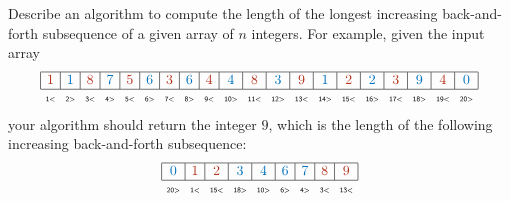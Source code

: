 \begin{enumerate}[label=\arabic*.,ref=\thechapter.\arabic*,leftmargin=*,align=left,widest*=99,itemsep=1.5ex plus 0.5ex]
Describe an algorithm to compute the length of the longest increasing back-and-forth subsequence of a given array of $n$ integers.
For example, given the input array
\[
\setlength{\arraycolsep}{3.7pt}
\begin{array}{|*{20}{c|}}
\hline
{\color{JEred}1} & {\color{JEcyan}1} & {\color{JEred}8} & {\color{JEcyan}7} & {\color{JEred}5} & {\color{JEcyan}6} & {\color{JEred}3} & {\color{JEcyan}6} & {\color{JEred}4} & {\color{JEcyan}4} & {\color{JEred}8} & {\color{JEcyan}3} & {\color{JEred}9} & {\color{JEcyan}1} & {\color{JEred}2} & {\color{JEcyan}2} & {\color{JEred}3} & {\color{JEcyan}9} & {\color{JEred}4} & {\color{JEcyan}0}\\
\hline
\multicolumn{1}{c}{\textsf{\tiny 1\textless}} & \multicolumn{1}{c}{\textsf{\tiny 2\textgreater}} & \multicolumn{1}{c}{\textsf{\tiny 3\textless}} & \multicolumn{1}{c}{\textsf{\tiny 4\textgreater}} & \multicolumn{1}{c}{\textsf{\tiny 5\textless}} & \multicolumn{1}{c}{\textsf{\tiny 6\textgreater}} & \multicolumn{1}{c}{\textsf{\tiny 7\textless}} & \multicolumn{1}{c}{\textsf{\tiny 8\textgreater}} & \multicolumn{1}{c}{\textsf{\tiny 9\textless}} & \multicolumn{1}{c}{\textsf{\tiny 10\textgreater}} & \multicolumn{1}{c}{\textsf{\tiny 11\textless}} & \multicolumn{1}{c}{\textsf{\tiny 12\textgreater}} & \multicolumn{1}{c}{\textsf{\tiny 13\textless}} & \multicolumn{1}{c}{\textsf{\tiny 14\textgreater}} & \multicolumn{1}{c}{\textsf{\tiny 15\textless}} & \multicolumn{1}{c}{\textsf{\tiny 16\textgreater}} & \multicolumn{1}{c}{\textsf{\tiny 17\textless}} & \multicolumn{1}{c}{\textsf{\tiny 18\textgreater}} & \multicolumn{1}{c}{\textsf{\tiny 19\textless}} & \multicolumn{1}{c}{\textsf{\tiny 20\textgreater}}
\end{array}
\]
your algorithm should return the integer $9$, which is the length of the following increasing back-and-forth subsequence:
\[
\setlength{\arraycolsep}{3.7pt}
\begin{array}{|*{9}{c|}}
\hline
{\color{JEcyan}0} & {\color{JEred}1} & {\color{JEred}2} & {\color{JEcyan}3} & {\color{JEcyan}4} & {\color{JEcyan}6} & {\color{JEcyan}7} & {\color{JEred}8} & {\color{JEred}9}\\
\hline
\multicolumn{1}{c}{\textsf{\tiny 20\textgreater}} & \multicolumn{1}{c}{\textsf{\tiny 1\textless}} & \multicolumn{1}{c}{\textsf{\tiny 15\textless}} & \multicolumn{1}{c}{\textsf{\tiny 18\textgreater}} & \multicolumn{1}{c}{\textsf{\tiny 10\textgreater}} & \multicolumn{1}{c}{\textsf{\tiny 6\textgreater}} & \multicolumn{1}{c}{\textsf{\tiny 4\textgreater}} & \multicolumn{1}{c}{\textsf{\tiny 3\textless}} & \multicolumn{1}{c}{\textsf{\tiny 13\textless}}
\end{array}
\]


\end{enumerate}
